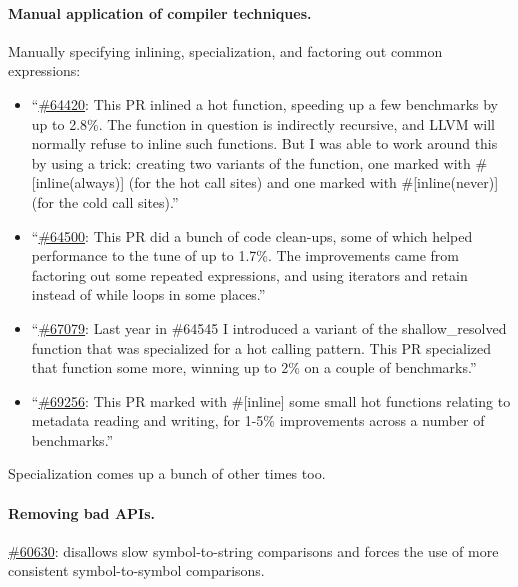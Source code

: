 \documentclass[a4paper]{report}
\begin{document}
\paragraph{Manual application of compiler techniques.} Manually specifying inlining, specialization, and factoring out common expressions:
\begin{itemize}[noitemsep]
\item ``\href{https://github.com/rust-lang/rust/pull/64420}{\#64420}: This PR inlined a hot function, speeding up a few benchmarks by up to 2.8\%. The function in question is indirectly recursive, and LLVM will normally refuse to inline such functions. But I was able to work around this by using a trick: creating two variants of the function, one marked with \#[inline(always)] (for the hot call sites) and one marked with \#[inline(never)] (for the cold call sites).''
\item ``\href{https://github.com/rust-lang/rust/pull/64500}{\#64500}: This PR did a bunch of code clean-ups, some of which helped performance to the tune of up to 1.7\%. The improvements came from factoring out some repeated expressions, and using iterators and retain instead of while loops in some places.''
\item ``\href{https://github.com/rust-lang/rust/pull/67079}{\#67079}: Last year in \#64545 I introduced a variant of the shallow\_resolved function that was specialized for a hot calling pattern. This PR specialized that function some more, winning up to 2\% on a couple of benchmarks.''
\item ``\href{https://github.com/rust-lang/rust/pull/69256}{\#69256}: This PR marked with \#[inline] some small hot functions relating to metadata reading and writing, for 1-5\% improvements across a number of benchmarks.''
\end{itemize}
Specialization comes up a bunch of other times too.

\paragraph{Removing bad APIs.} \href{https://github.com/rust-lang/rust/pull/60630}{\#60630}: disallows slow symbol-to-string comparisons and forces the use of more consistent symbol-to-symbol comparisons.
\end{document}
